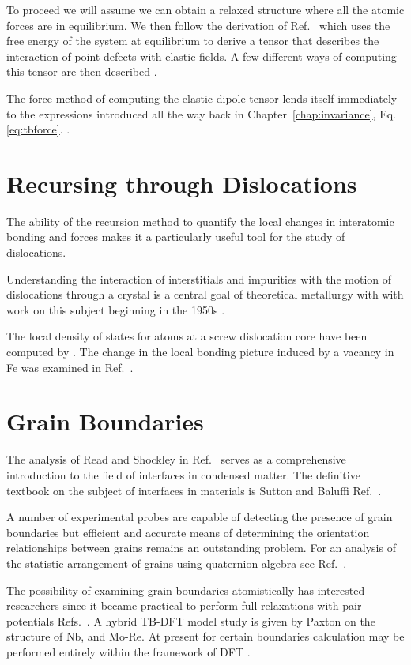 To proceed we will assume we can obtain a relaxed structure where all the atomic forces are
in equilibrium. We then follow the derivation of Ref.~\cite{freedman09} which uses the free energy
of the system at equilibrium to derive a tensor that describes the interaction of point defects 
with elastic fields. A few different ways of computing this tensor are then described \cite{nazarov16}.

The force method of computing the elastic dipole tensor lends itself 
immediately to the expressions introduced all the way back in 
Chapter~\ref{chap:invariance}, Eq.\ref{eq:tbforce}. \cite{paxton90}.

\section{Recursing through Dislocations}
The ability of the recursion method to quantify the local changes in interatomic bonding and
forces makes it a particularly useful tool for the study of dislocations. 

Understanding the interaction of interstitials and impurities with the motion of
dislocations through a crystal is a central goal of theoretical metallurgy with
with work on this subject beginning in the 1950s \cite{cochardt55}.

The local density of states for atoms at a screw dislocation core have been computed by \cite{paidar81}. 
The change in the local bonding picture induced by a vacancy in Fe was examined in Ref.~\cite{ohta87}.

\section{Grain Boundaries}
The analysis of Read and Shockley in Ref.~\cite{read50} serves as a comprehensive
introduction to the field of interfaces in condensed matter. The definitive textbook
on the subject of interfaces in materials is Sutton and Baluffi Ref.~\cite{sutton95}.

A number of experimental probes are capable of detecting the presence of 
grain boundaries but efficient and accurate means of determining 
the orientation relationships between grains remains an outstanding problem.
For an analysis of the statistic arrangement of grains using quaternion
algebra see Ref.~\cite{sutton96}.

The possibility of examining grain boundaries atomistically has interested
researchers since it became practical to perform full relaxations with pair
potentials Refs.~\cite{bristowe75,wolf83, rittner96, tschopp07}.
A hybrid TB-DFT model study is given by Paxton \cite{paxton96} on the structure of Nb, and Mo-Re.
At present for certain boundaries calculation may be performed entirely within
the framework of DFT \cite{momida13, du11, du12, mceniry18}.

